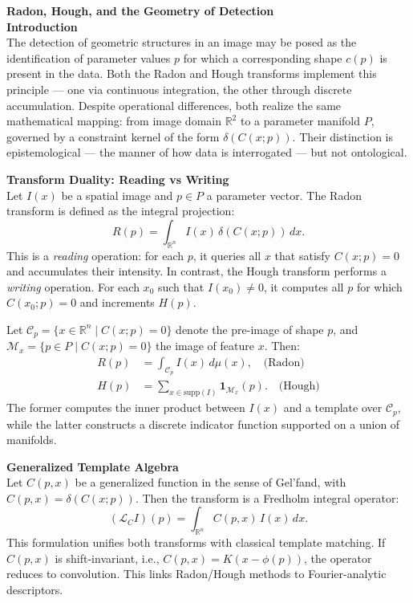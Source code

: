\begin{technical}
{\Large\textbf{Radon, Hough, and the Geometry of Detection}}\\[0.7em]

\textbf{Introduction}\\[0.5em]
The detection of geometric structures in an image may be posed as the identification of parameter values $p$ for which a corresponding shape $c(p)$ is present in the data. Both the Radon and Hough transforms implement this principle — one via continuous integration, the other through discrete accumulation. Despite operational differences, both realize the same mathematical mapping: from image domain $\mathbb{R}^2$ to a parameter manifold $P$, governed by a constraint kernel of the form $\delta(C(x; p))$. Their distinction is epistemological — the manner of how data is interrogated — but not ontological.

\textbf{Transform Duality: Reading vs Writing}\\[0.5em]
Let $I(x)$ be a spatial image and $p \in P$ a parameter vector. The Radon transform is defined as the integral projection:
\[
R(p) = \int_{\mathbb{R}^n} I(x)\, \delta(C(x; p))\, dx.
\]
This is a \emph{reading} operation: for each $p$, it queries all $x$ that satisfy $C(x; p) = 0$ and accumulates their intensity. In contrast, the Hough transform performs a \emph{writing} operation. For each $x_0$ such that $I(x_0) \ne 0$, it computes all $p$ for which $C(x_0; p) = 0$ and increments $H(p)$.

Let $\mathcal{C}_p = \{x \in \mathbb{R}^n \mid C(x; p) = 0\}$ denote the pre-image of shape $p$, and $\mathcal{M}_x = \{p \in P \mid C(x; p) = 0\}$ the image of feature $x$. Then:
\begin{align*}
R(p) &= \int_{\mathcal{C}_p} I(x)\, d\mu(x), \quad \text{(Radon)}\\
H(p) &= \sum_{x \in \mathrm{supp}(I)} \mathbf{1}_{\mathcal{M}_x}(p). \quad \text{(Hough)}
\end{align*}
The former computes the inner product between $I(x)$ and a template over $\mathcal{C}_p$, while the latter constructs a discrete indicator function supported on a union of manifolds.

\textbf{Generalized Template Algebra}\\[0.5em]
Let $C(p,x)$ be a generalized function in the sense of Gel'fand, with $C(p,x) = \delta(C(x; p))$. Then the transform is a Fredholm integral operator:
\[
(\mathcal{L}_C I)(p) = \int_{\mathbb{R}^n} C(p,x)\, I(x)\, dx.
\]
This formulation unifies both transforms with classical template matching. If $C(p,x)$ is shift-invariant, i.e., $C(p,x) = K(x - \phi(p))$, the operator reduces to convolution. This links Radon/Hough methods to Fourier-analytic descriptors.


\end{technical}
